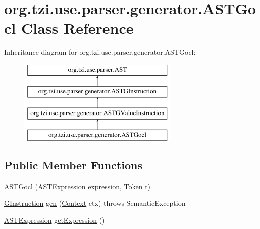 \hypertarget{classorg_1_1tzi_1_1use_1_1parser_1_1generator_1_1_a_s_t_gocl}{\section{org.\-tzi.\-use.\-parser.\-generator.\-A\-S\-T\-Gocl Class Reference}
\label{classorg_1_1tzi_1_1use_1_1parser_1_1generator_1_1_a_s_t_gocl}
}
Inheritance diagram for org.\-tzi.\-use.\-parser.\-generator.\-A\-S\-T\-Gocl\-:\begin{figure}[H]
\begin{center}
\leavevmode
\includegraphics[height=4.000000cm]{classorg_1_1tzi_1_1use_1_1parser_1_1generator_1_1_a_s_t_gocl}
\end{center}
\end{figure}
\subsection*{Public Member Functions}
\begin{DoxyCompactItemize}
\item 
\hyperlink{classorg_1_1tzi_1_1use_1_1parser_1_1generator_1_1_a_s_t_gocl_ad088d8a5561ecd47c71c13fc27824045}{A\-S\-T\-Gocl} (\hyperlink{classorg_1_1tzi_1_1use_1_1parser_1_1ocl_1_1_a_s_t_expression}{A\-S\-T\-Expression} expression, Token t)
\item 
\hyperlink{interfaceorg_1_1tzi_1_1use_1_1gen_1_1assl_1_1statics_1_1_g_instruction}{G\-Instruction} \hyperlink{classorg_1_1tzi_1_1use_1_1parser_1_1generator_1_1_a_s_t_gocl_a36d666285417fcffc75804dce21064ce}{gen} (\hyperlink{classorg_1_1tzi_1_1use_1_1parser_1_1_context}{Context} ctx)  throws Semantic\-Exception 
\item 
\hyperlink{classorg_1_1tzi_1_1use_1_1parser_1_1ocl_1_1_a_s_t_expression}{A\-S\-T\-Expression} \hyperlink{classorg_1_1tzi_1_1use_1_1parser_1_1generator_1_1_a_s_t_gocl_a15a0c7af654c3cdef4021ac9293fd92f}{get\-Expression} ()
\end{DoxyCompactItemize}



